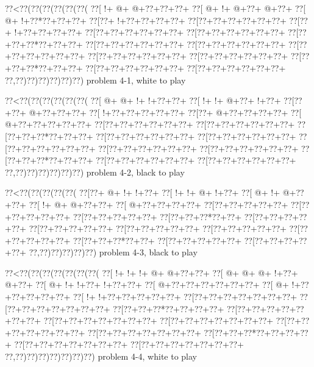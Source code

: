 \vbox{\vbox{\goo
\0??<\0??(\0??(\0??(\0??(\0??(\0??(
\0??[\- !+\- @+\- @+\0??+\0??+\0??+
\0??[\- @+\- !+\- @+\0??+\- @+\0??+
\0??[\- @+\- !+\0??*\0??+\0??+\0??+
\0??[\0??+\- !+\0??+\0??+\0??+\0??+
\0??[\0??+\0??+\0??+\0??+\0??+\0??+
\0??[\0??+\- !+\0??+\0??+\0??+\0??+
\0??[\0??+\0??+\0??+\0??+\0??+\0??+
\0??[\0??+\0??+\0??+\0??+\0??+\0??+
\0??[\0??+\0??+\0??*\0??+\0??+\0??+
\0??[\0??+\0??+\0??+\0??+\0??+\0??+
\0??[\0??+\0??+\0??+\0??+\0??+\0??+
\0??[\0??+\0??+\0??+\0??+\0??+\0??+
\0??[\0??+\0??+\0??+\0??+\0??+\0??+
\0??[\0??+\0??+\0??+\0??+\0??+\0??+
\0??[\0??+\0??+\0??*\0??+\0??+\0??+
\0??[\0??+\0??+\0??+\0??+\0??+\0??+
\0??[\0??+\0??+\0??+\0??+\0??+\0??+
\0??,\0??)\0??)\0??)\0??)\0??)\0??)
}
\hfil problem 4-1, white to play\hfil\break
}

\vbox{\vbox{\goo
\0??<\0??(\0??(\0??(\0??(\0??(\0??(
\0??[\- @+\- @+\- !+\- !+\0??+\0??+
\0??[\- !+\- !+\- @+\0??+\- !+\0??+
\0??[\0??+\0??+\- @+\0??+\0??+\0??+
\0??[\- !+\0??+\0??+\0??+\0??+\0??+
\0??[\0??+\- @+\0??+\0??+\0??+\0??+
\0??[\- @+\0??+\0??+\0??+\0??+\0??+
\0??[\0??+\0??+\0??+\0??+\0??+\0??+
\0??[\0??+\0??+\0??+\0??+\0??+\0??+
\0??[\0??+\0??+\0??*\0??+\0??+\0??+
\0??[\0??+\0??+\0??+\0??+\0??+\0??+
\0??[\0??+\0??+\0??+\0??+\0??+\0??+
\0??[\0??+\0??+\0??+\0??+\0??+\0??+
\0??[\0??+\0??+\0??+\0??+\0??+\0??+
\0??[\0??+\0??+\0??+\0??+\0??+\0??+
\0??[\0??+\0??+\0??*\0??+\0??+\0??+
\0??[\0??+\0??+\0??+\0??+\0??+\0??+
\0??[\0??+\0??+\0??+\0??+\0??+\0??+
\0??,\0??)\0??)\0??)\0??)\0??)\0??)
}
\hfil problem 4-2, black to play\hfil\break
}

\vbox{\vbox{\goo
\0??<\0??(\0??(\0??(\0??(\0??(
\0??[\0??+\- @+\- !+\- !+\0??+
\0??[\- !+\- !+\- @+\- !+\0??+
\0??[\- @+\- !+\- @+\0??+\0??+
\0??[\- !+\- @+\- @+\0??+\0??+
\0??[\- @+\0??+\0??+\0??+\0??+
\0??[\0??+\0??+\0??+\0??+\0??+
\0??[\0??+\0??+\0??+\0??+\0??+
\0??[\0??+\0??+\0??+\0??+\0??+
\0??[\0??+\0??+\0??*\0??+\0??+
\0??[\0??+\0??+\0??+\0??+\0??+
\0??[\0??+\0??+\0??+\0??+\0??+
\0??[\0??+\0??+\0??+\0??+\0??+
\0??[\0??+\0??+\0??+\0??+\0??+
\0??[\0??+\0??+\0??+\0??+\0??+
\0??[\0??+\0??+\0??*\0??+\0??+
\0??[\0??+\0??+\0??+\0??+\0??+
\0??[\0??+\0??+\0??+\0??+\0??+
\0??,\0??)\0??)\0??)\0??)\0??)
}
\hfil problem 4-3, black to play\hfil\break
}

\vbox{\vbox{\goo
\0??<\0??(\0??(\0??(\0??(\0??(\0??(\0??(
\0??[\- !+\- !+\- !+\- @+\- @+\0??+\0??+
\0??[\- @+\- @+\- @+\- !+\0??+\- @+\0??+
\0??[\- @+\- !+\- !+\0??+\- !+\0??+\0??+
\0??[\- @+\0??+\0??+\0??+\0??+\0??+\0??+
\0??[\- @+\- !+\0??+\0??+\0??+\0??+\0??+
\0??[\- !+\- !+\0??+\0??+\0??+\0??+\0??+
\0??[\0??+\0??+\0??+\0??+\0??+\0??+\0??+
\0??[\0??+\0??+\0??+\0??+\0??+\0??+\0??+
\0??[\0??+\0??+\0??*\0??+\0??+\0??+\0??+
\0??[\0??+\0??+\0??+\0??+\0??+\0??+\0??+
\0??[\0??+\0??+\0??+\0??+\0??+\0??+\0??+
\0??[\0??+\0??+\0??+\0??+\0??+\0??+\0??+
\0??[\0??+\0??+\0??+\0??+\0??+\0??+\0??+
\0??[\0??+\0??+\0??+\0??+\0??+\0??+\0??+
\0??[\0??+\0??+\0??*\0??+\0??+\0??+\0??+
\0??[\0??+\0??+\0??+\0??+\0??+\0??+\0??+
\0??[\0??+\0??+\0??+\0??+\0??+\0??+\0??+
\0??,\0??)\0??)\0??)\0??)\0??)\0??)\0??)
}
\hfil problem 4-4, white to play\hfil\break
}

